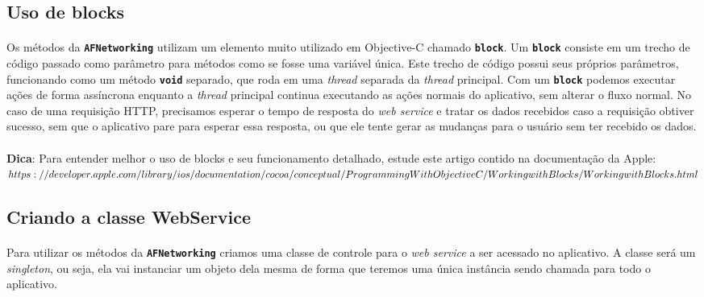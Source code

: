 \documentclass[a4paper,12pt,brazil,doubleside]{book}
\begin{document}
\begin{singlespace}
\subsection{Uso de blocks}

\paragraph{}Os métodos da \texttt{\textbf{AFNetworking}} utilizam um elemento muito utilizado em Objective-C chamado \texttt{\textbf{block}}. Um \texttt{\textbf{block}} consiste em um trecho de código passado como parâmetro para métodos como se fosse uma variável única. Este trecho de código possui seus próprios parâmetros, funcionando como um método \texttt{\textbf{void}} separado, que roda em uma \emph{thread} separada da \emph{thread} principal. Com um \texttt{\textbf{block}} podemos executar ações de forma assíncrona enquanto a \emph{thread} principal continua executando as ações normais do aplicativo, sem alterar o fluxo normal. No caso de uma requisição HTTP, precisamos esperar o tempo de resposta do \emph{web service} e tratar os dados recebidos caso a requisição obtiver sucesso, sem que o aplicativo pare para esperar essa resposta, ou que ele tente gerar as mudanças para o usuário sem ter recebido os dados.

\bigskip

\begin{framed}
\paragraph{}\textbf{Dica}:  Para entender melhor o uso de blocks e seu funcionamento detalhado, estude este artigo contido na documentação da Apple:\\
\(https://developer.apple.com/library/ios/documentation/cocoa/conceptual/\\ProgrammingWithObjectiveC/WorkingwithBlocks/WorkingwithBlocks.html\)
\end{framed}

\subsection{Criando a classe WebService}

\paragraph{}Para utilizar os métodos da \texttt{\textbf{AFNetworking}} criamos uma classe de controle para o \emph{web service} a ser acessado no aplicativo. A classe será um \emph{singleton}, ou seja, ela vai instanciar um objeto dela mesma de forma que teremos uma única instância sendo chamada para todo o aplicativo.

\end{singlespace}
\end{document}
